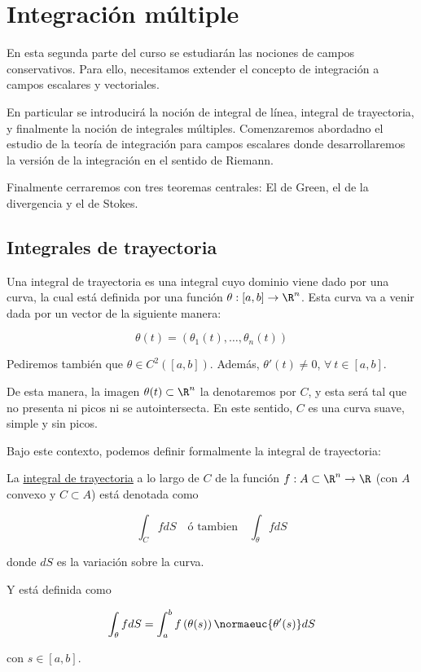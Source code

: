 \section{Integración múltiple}

En esta segunda parte del curso se estudiarán las nociones de campos conservativos. Para ello, necesitamos extender el concepto de integración a campos escalares y vectoriales.

En particular se introducirá la noción de integral de línea, integral de trayectoria, y finalmente la noción de integrales múltiples. Comenzaremos abordadno el estudio de la teoría de integración para campos escalares donde desarrollaremos la versión de la integración en el sentido de Riemann.

Finalmente cerraremos con tres teoremas centrales: El de Green, el de la divergencia y el de Stokes.

\subsection{Integrales de trayectoria}

Una integral de trayectoria es una integral cuyo dominio viene dado por una curva, la cual está definida por una función $\theta: [a,b] \rightarrow \R^n$. Esta curva va a venir dada por un vector de la siguiente manera:

\[
\theta(t) = (\theta_1(t), \dots, \theta_n(t))
\]

Pediremos también que $\theta \in C^2\left( [a,b] \right)$. Además, $\theta'(t) \neq 0$, $\forall~t \in [a,b]$.

De esta manera, la imagen $\theta(t) \subset \R^n$ la denotaremos por $C$, y esta será tal que no presenta ni picos ni se autointersecta. En este sentido, $C$ es una curva suave, simple y sin picos.

Bajo este contexto, podemos definir formalmente la integral de trayectoria:

\begin{defn}
    La \ul{integral de trayectoria} a lo largo de $C$ de la función $f: A \subset \R^n \rightarrow \R$ (con $A$ convexo y $C \subset A$) está denotada como
    
    \[
    \int_C fdS \quad \text{ó tambien} \quad \int_{\theta} fdS
    \]
    
    \noindent donde $dS$ es la variación sobre la curva.
    
    Y está definida como
    
    \[
    \int_{\theta} fdS = \int_a^b f\left( \theta(s) \right) \normaeuc{\theta'(s)}dS
    \]
    
    \noindent con $s \in [a,b]$.
\end{defn}

